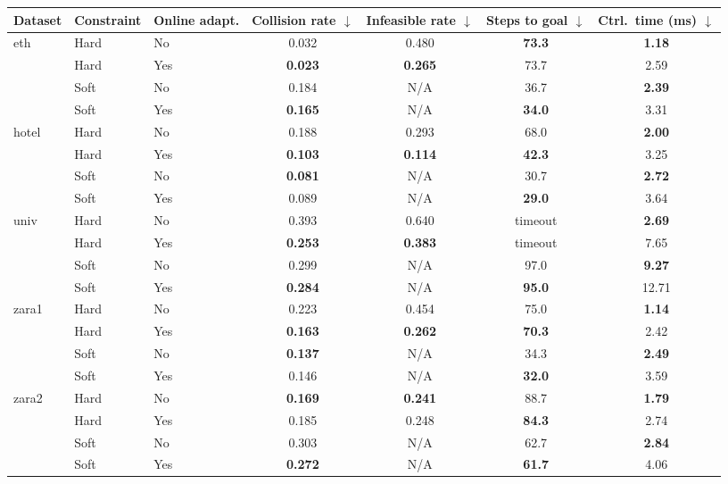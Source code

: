 \begin{tabular}{lllcccc}
\hline
Dataset & Constraint & Online adapt. & Collision rate $\downarrow$ & Infeasible rate $\downarrow$ & Steps to goal $\downarrow$ & Ctrl.\ time (ms) $\downarrow$ \\
\hline
eth & Hard & No & 0.032 & 0.480 & \textbf{73.3} & \textbf{1.18} \\
 & Hard & Yes & \textbf{0.023} & \textbf{0.265} & 73.7 & 2.59 \\
 & Soft & No & 0.184 & N/A & 36.7 & \textbf{2.39} \\
 & Soft & Yes & \textbf{0.165} & N/A & \textbf{34.0} & 3.31 \\
\hline
hotel & Hard & No & 0.188 & 0.293 & 68.0 & \textbf{2.00} \\
 & Hard & Yes & \textbf{0.103} & \textbf{0.114} & \textbf{42.3} & 3.25 \\
 & Soft & No & \textbf{0.081} & N/A & 30.7 & \textbf{2.72} \\
 & Soft & Yes & 0.089 & N/A & \textbf{29.0} & 3.64 \\
\hline
univ & Hard & No & 0.393 & 0.640 & timeout & \textbf{2.69} \\
 & Hard & Yes & \textbf{0.253} & \textbf{0.383} & timeout & 7.65 \\
 & Soft & No & 0.299 & N/A & 97.0 & \textbf{9.27} \\
 & Soft & Yes & \textbf{0.284} & N/A & \textbf{95.0} & 12.71 \\
\hline
zara1 & Hard & No & 0.223 & 0.454 & 75.0 & \textbf{1.14} \\
 & Hard & Yes & \textbf{0.163} & \textbf{0.262} & \textbf{70.3} & 2.42 \\
 & Soft & No & \textbf{0.137} & N/A & 34.3 & \textbf{2.49} \\
 & Soft & Yes & 0.146 & N/A & \textbf{32.0} & 3.59 \\
\hline
zara2 & Hard & No & \textbf{0.169} & \textbf{0.241} & 88.7 & \textbf{1.79} \\
 & Hard & Yes & 0.185 & 0.248 & \textbf{84.3} & 2.74 \\
 & Soft & No & 0.303 & N/A & 62.7 & \textbf{2.84} \\
 & Soft & Yes & \textbf{0.272} & N/A & \textbf{61.7} & 4.06 \\
\hline
\end{tabular}